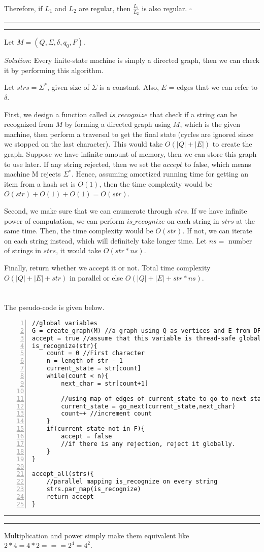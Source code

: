 \documentclass[a4paper, 11pt]{article}
\newcommand{\question}[2] {\vspace{.25in} \hrule\vspace{0.5em}
	\noindent{\bf #1: #2} \vspace{0.5em}
	\hrule \vspace{.10in}}
\begin{document}
	Therefore, if $L_1$ and $L_2$ are regular, then $\frac{L_1}{L_2}$ is also regular. $\square$
	
	\question{5}{Does It Accept Everything?}
	Let $M = (Q, \Sigma, \delta, q_0, F)$.
	
	{\em Solution}: Every finite-state machine is simply a directed graph, then we can check it by performing this algorithm.
	
	Let $strs = \Sigma^*$, given size of $\Sigma$ is a constant. Also, $E$ = edges that we can refer to $\delta$.
	
	First, we design a function called $is\_recognize$ that check if a string can be recognized from $M$ by forming a directed graph using $M$, which is the given machine, then perform a traversal to get the final state (cycles are ignored since we stopped on the last character). This would take $O(|Q|+|E|)$ to create the graph. Suppose we have infinite amount of memory, then we can store this graph to use later. If any string rejected, then we set the $accept$ to false, which means machine M rejects $\Sigma^*$. Hence, assuming amortized running time for getting an item from a hash set is $O(1)$, then the time complexity would be $O(str)+O(1)+O(1) = O(str)$.
	
	Second, we make sure that we can enumerate through $strs$. If we have infinite power of computation, we can perform $is\_recognize$ on each string in $strs$ at the same time. Then, the time complexity would be $O(str)$. If not, we can iterate on each string instead, which will definitely take longer time. Let $ns =$ number of strings in $strs$, it would take $O(str*{ns})$.
	
	Finally, return whether we accept it or not. Total time complexity $O(|Q|+|E|+str)$ in parallel or else $O(|Q|+|E|+str*{ns})$.
	\\\\\\
	The pseudo-code is given below.
	
\begin{Verbatim}[numbers=left]
//global variables
G = create_graph(M) //a graph using Q as vertices and E from DFA
accept = true //assume that this variable is thread-safe globally
is_recognize(str){
	count = 0 //First character
	n = length of str - 1
	current_state = str[count]
	while(count < n){
		next_char = str[count+1]
		
		//using map of edges of current_state to go to next state
		current_state = go_next(current_state,next_char)
		count++ //increment count
	}
	if(current_state not in F){
		accept = false 
		//if there is any rejection, reject it globally.
	}
}

accept_all(strs){
	//parallel mapping is_recognize on every string
	strs.par_map(is_recognize)
	return accept
}
\end{Verbatim}

	
	
	\question{6}{All The Same?}
	Multiplication and power simply make them equivalent like $2*4 = 4*2 === 2^4 = 4^2$.
	
\end{document}

